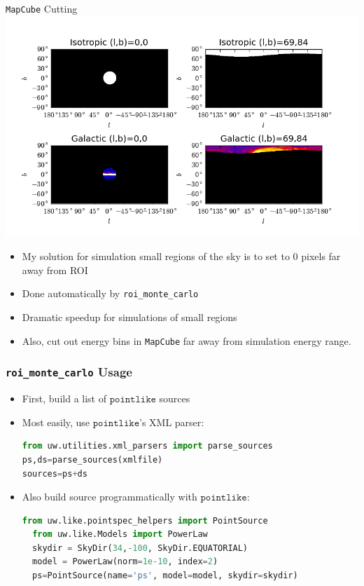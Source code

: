 \documentclass[12pt]{beamer}
\newcommand{\pointlike}{\ensuremath{\mathtt{pointlike}}\xspace}
\newcommand{\roimc}{\texttt{roi\_monte\_carlo}\xspace}
\newcommand{\mapcube}{\texttt{MapCube}\xspace}
\begin{document}
\begin{frame}{\mapcube Cutting}
  \includegraphics[scale=0.4]{plots/allsky_cubes.png}
  \begin{itemize}
    \item My solution for simulation small regions of the sky is to set to 0 pixels
      far away from ROI
    \item Done automatically by \roimc
    \item Dramatic speedup for simulations of small regions
    \item Also, cut out energy bins in \mapcube far away from simulation energy range.
    \end{itemize}
\end{frame}

\begin{frame}[fragile]
  \frametitle{\roimc Usage}
  \begin{itemize}
    \item First, build a list of \pointlike sources
    \item Most easily, use \pointlike's XML parser:
\begin{lstlisting}[language=Python]
from uw.utilities.xml_parsers import parse_sources
ps,ds=parse_sources(xmlfile)
sources=ps+ds
\end{lstlisting}
\item Also build source programmatically with \pointlike:
\begin{lstlisting}[language=Python]
  from uw.like.pointspec_helpers import PointSource
  from uw.like.Models import PowerLaw
  skydir = SkyDir(34,-100, SkyDir.EQUATORIAL)
  model = PowerLaw(norm=1e-10, index=2)
  ps=PointSource(name='ps', model=model, skydir=skydir)
\end{lstlisting}
  \end{itemize}
\end{frame}
\end{document}
